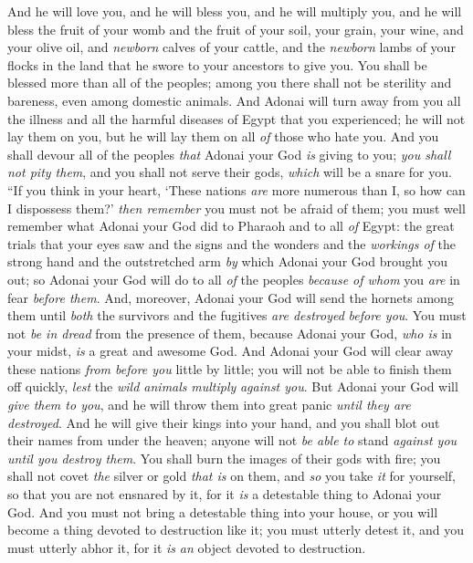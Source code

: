 \begin{biblechapter}
\verse And he will love you, and he will bless you, and he will multiply you, and he will bless the fruit of your womb and the fruit of your soil, your grain, your wine, and your olive oil, and \textit{newborn} calves of your cattle, and the \textit{newborn} lambs of your flocks in the land that he swore to your ancestors to give you.
\verse You shall be blessed more than all of the peoples; among you there shall not be sterility and bareness, even among domestic animals.
\verse And Adonai will turn away from you all the illness and all the harmful diseases of Egypt that you experienced; he will not lay them on you, but he will lay them on all \textit{of} those who hate you.
\verse And you shall devour all of the peoples \textit{that} Adonai your God \textit{is} giving to you; \textit{you shall not pity them}, and you shall not serve their gods, \textit{which} will be a snare for you.
\verse “If you think in your heart, ‘These nations \textit{are} more numerous than I, so how can I dispossess them?’
\verse \textit{then remember} you must not be afraid of them; you must well remember what Adonai your God did to Pharaoh and to all \textit{of} Egypt:
\verse the great trials that your eyes saw and the signs and the wonders and the \textit{workings of} the strong hand and the outstretched arm \textit{by} which Adonai your God brought you out; so Adonai your God will do to all \textit{of} the peoples \textit{because of whom} you \textit{are} in fear \textit{before them}.
\verse And, moreover, Adonai your God will send the hornets among them until \textit{both} the survivors and the fugitives \textit{are destroyed} \textit{before you}.
\verse You must not \textit{be in dread} from the presence of them, because Adonai your God, \textit{who is} in your midst, \textit{is} a great and awesome God.
\verse And Adonai your God will clear away these nations \textit{from before you} little by little; you will not be able to finish them off quickly, \textit{lest} the \textit{wild animals} \textit{multiply} \textit{against you}.
\verse But Adonai your God will \textit{give them to you}, and he will throw them into great panic \textit{until they are destroyed}.
\verse And he will give their kings into your hand, and you shall blot out their names from under the heaven; anyone will not \textit{be able to} stand \textit{against you} \textit{until you destroy them}.
\verse You shall burn the images of their gods with fire; you shall not covet \textit{the} silver or gold \textit{that is} on them, and \textit{so} you take \textit{it} for yourself, so that you are not ensnared by it, for it \textit{is} a detestable thing to Adonai your God.
\verse And you must not bring a detestable thing into your house, or you will become a thing devoted to destruction like it; you must utterly detest it, and you must utterly abhor it, for it \textit{is} \textit{an} object devoted to destruction.
\end{biblechapter}


